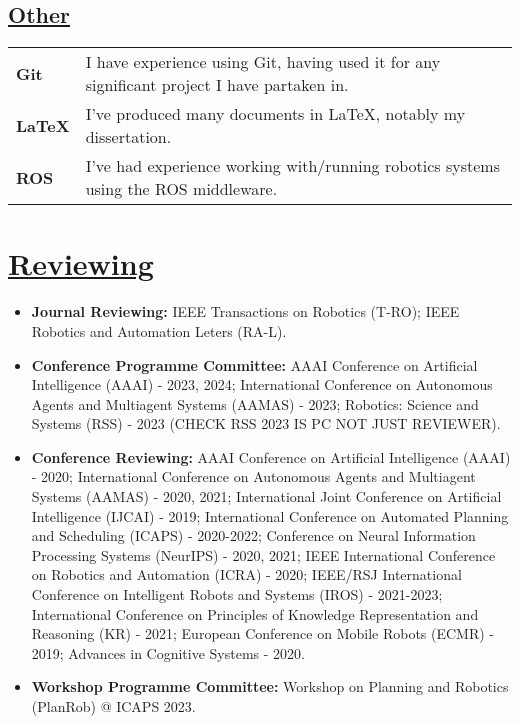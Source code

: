 \documentclass[11pt]{article}
\begin{document}
		\subsection*{\underline{Other}}
		\renewcommand{\arraystretch}{1.3}%
		\begin{tabular}{ll}
			 \textbf{Git} & I have experience using Git, having used it for any significant project I have partaken in.\\
			\textbf{LaTeX} & I've produced many documents in LaTeX, notably my dissertation.\\
			\textbf{ROS} & I've had experience working with/running robotics systems using the ROS middleware.
		\end{tabular}
\fi

\section*{\underline{Reviewing}}
\begin{itemize}
\item \textbf{Journal Reviewing:} IEEE Transactions on Robotics (T-RO); IEEE Robotics and Automation Leters (RA-L).
\item \textbf{Conference Programme Committee:}  AAAI Conference on Artificial Intelligence (AAAI) - 2023, 2024; International Conference on Autonomous Agents and Multiagent Systems (AAMAS) - 2023;  Robotics: Science and Systems (RSS) - 2023 (CHECK RSS 2023 IS PC NOT JUST REVIEWER).
\item \textbf{Conference Reviewing:} AAAI Conference on Artificial Intelligence (AAAI) - 2020; International Conference on Autonomous Agents and Multiagent Systems (AAMAS) - 2020, 2021; International Joint Conference on Artificial Intelligence (IJCAI) - 2019; International Conference on Automated Planning and Scheduling (ICAPS) - 2020-2022; Conference on Neural Information Processing Systems (NeurIPS) - 2020, 2021; IEEE International Conference on Robotics and Automation (ICRA) - 2020; IEEE/RSJ International Conference on Intelligent Robots and Systems (IROS) - 2021-2023; International Conference on Principles of Knowledge Representation and Reasoning (KR) - 2021; European Conference on Mobile Robots (ECMR) - 2019; Advances in Cognitive Systems - 2020.
\item\textbf{Workshop Programme Committee:} Workshop on Planning and Robotics (PlanRob) @ ICAPS 2023.
\end{itemize}
\end{document}
